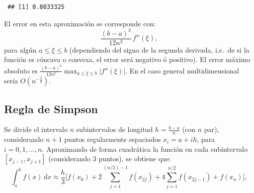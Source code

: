 \documentclass[
]{book}
\theoremstyle{break}
\theoremstyle{nonumberplain}
\begin{document}
\begin{verbatim}
 ## [1] 0.8033325
\end{verbatim}

El error en esta aproximación se corresponde con:
\[ \frac{(b-a)^3}{12n^2}\,f''(\xi), \]
para algún \(a\leq \xi \leq b\) (dependiendo del signo de la segunda derivada,
i.e.~de si la función es cóncava o convexa, el error será negativo ó positivo). El error
máximo absoluto es \(\frac{(b-a)^3}{12n^2}\max_{a\leq \xi \leq b}\left|f''(\xi)\right|\).
En el caso general multidimensional sería \(O(n^{-\frac{2}{d}})\).

\hypertarget{regla-de-simpson}{%
\subsection{Regla de Simpson}\label{regla-de-simpson}}

Se divide el intervalo \(n\) subintervalos de longitud \(h= \frac{b-a}{n}\) (con \(n\) par),
considerando \(n + 1\) puntos regularmente espaciados \(x_i = a + ih\), para \(i = 0, 1, ..., n\).
Aproximando de forma cuadrática la función en cada subintervalo \([x_{j-1},x_{j+1}]\)
(considerando 3 puntos), se obtiene que:
\[ \int_a^b f(x) \, dx \approx \frac{h}{3} \bigg[ 
f(x_0)+2\sum_{j=1}^{(n/2)-1}f(x_{2j})+ 4\sum_{j=1}^{n/2}f(x_{2j-1})+f(x_n) \bigg],\]
\end{document}
